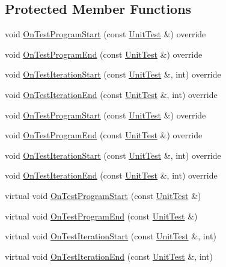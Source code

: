 \subsection*{Protected Member Functions}
\begin{DoxyCompactItemize}
\item 
void \mbox{\hyperlink{class_sequence_testing_listener_a2dcf940322a480b210d8e5e934dd0a79}{On\+Test\+Program\+Start}} (const \mbox{\hyperlink{classtesting_1_1_unit_test}{Unit\+Test}} \&) override
\item 
void \mbox{\hyperlink{class_sequence_testing_listener_a506077b57a6789daf900e61285a58d8a}{On\+Test\+Program\+End}} (const \mbox{\hyperlink{classtesting_1_1_unit_test}{Unit\+Test}} \&) override
\item 
void \mbox{\hyperlink{class_sequence_testing_listener_a31ffb1bb77e88fff266511b1d8427e20}{On\+Test\+Iteration\+Start}} (const \mbox{\hyperlink{classtesting_1_1_unit_test}{Unit\+Test}} \&, int) override
\item 
void \mbox{\hyperlink{class_sequence_testing_listener_ae3a4e15e6c811a7b70992669d659e11e}{On\+Test\+Iteration\+End}} (const \mbox{\hyperlink{classtesting_1_1_unit_test}{Unit\+Test}} \&, int) override
\item 
void \mbox{\hyperlink{class_sequence_testing_listener_a2dcf940322a480b210d8e5e934dd0a79}{On\+Test\+Program\+Start}} (const \mbox{\hyperlink{classtesting_1_1_unit_test}{Unit\+Test}} \&) override
\item 
void \mbox{\hyperlink{class_sequence_testing_listener_a506077b57a6789daf900e61285a58d8a}{On\+Test\+Program\+End}} (const \mbox{\hyperlink{classtesting_1_1_unit_test}{Unit\+Test}} \&) override
\item 
void \mbox{\hyperlink{class_sequence_testing_listener_a31ffb1bb77e88fff266511b1d8427e20}{On\+Test\+Iteration\+Start}} (const \mbox{\hyperlink{classtesting_1_1_unit_test}{Unit\+Test}} \&, int) override
\item 
void \mbox{\hyperlink{class_sequence_testing_listener_ae3a4e15e6c811a7b70992669d659e11e}{On\+Test\+Iteration\+End}} (const \mbox{\hyperlink{classtesting_1_1_unit_test}{Unit\+Test}} \&, int) override
\item 
virtual void \mbox{\hyperlink{class_sequence_testing_listener_a25b96acdbaa6f582e583e6b56bd39b42}{On\+Test\+Program\+Start}} (const \mbox{\hyperlink{classtesting_1_1_unit_test}{Unit\+Test}} \&)
\item 
virtual void \mbox{\hyperlink{class_sequence_testing_listener_aacac5e15bac089460841ff63a5c31f57}{On\+Test\+Program\+End}} (const \mbox{\hyperlink{classtesting_1_1_unit_test}{Unit\+Test}} \&)
\item 
virtual void \mbox{\hyperlink{class_sequence_testing_listener_a345641262fa10cc4b251ac54116db74b}{On\+Test\+Iteration\+Start}} (const \mbox{\hyperlink{classtesting_1_1_unit_test}{Unit\+Test}} \&, int)
\item 
virtual void \mbox{\hyperlink{class_sequence_testing_listener_a783bc01e2a95f5bf73bbde4d96832e0f}{On\+Test\+Iteration\+End}} (const \mbox{\hyperlink{classtesting_1_1_unit_test}{Unit\+Test}} \&, int)
\end{DoxyCompactItemize}
